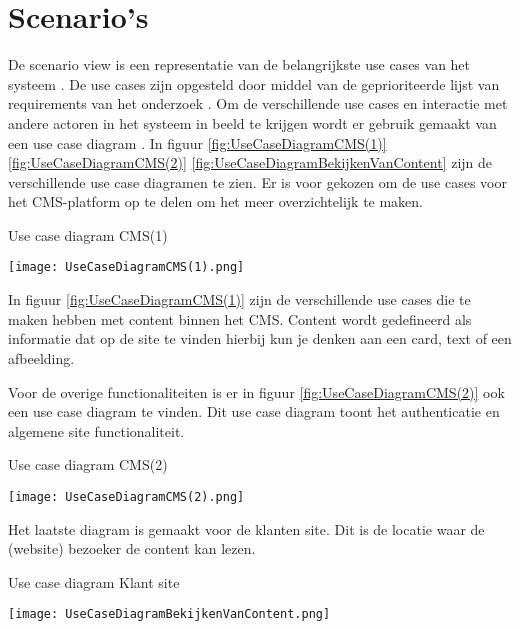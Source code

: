 \section{Scenario's}
De scenario view is een representatie van de belangrijkste use cases van het systeem \parencite{4+1ViewModelPaper}.
De use cases zijn opgesteld door middel van de geprioriteerde lijst van requirements van het onderzoek \parencite{DanteOnderzoek}.
Om de verschillende use cases en interactie met andere actoren in het systeem in beeld te krijgen wordt er gebruik gemaakt van een use case diagram \parencite{UseCaseDiagram}.
In figuur \ref{fig:UseCaseDiagramCMS(1)} \ref{fig:UseCaseDiagramCMS(2)} \ref{fig:UseCaseDiagramBekijkenVanContent} zijn de verschillende use case diagramen te zien.
Er is voor gekozen om de use cases voor het CMS-platform op te delen om het meer overzichtelijk te maken.

\whitespace[2]
\begin{graphic}
	\captionsetup{type=figure}
	\caption{Use case diagram CMS(1)}
	\texttt{[image: UseCaseDiagramCMS(1).png]}
	\label{fig:UseCaseDiagramCMS(1)}
\end{graphic}

\whitespace[2]
In figuur \ref{fig:UseCaseDiagramCMS(1)} zijn de verschillende use cases die te maken hebben met content binnen het CMS.
Content wordt gedefineerd als informatie dat op de site te vinden hierbij kun je denken aan een card, text of een afbeelding.
 
\newpage

\whitespace
Voor de overige functionaliteiten is er in figuur \ref{fig:UseCaseDiagramCMS(2)} ook een use case diagram te vinden.
Dit use case diagram toont het authenticatie en algemene site functionaliteit.

\whitespace
\begin{graphic}
	\captionsetup{type=figure}
	\caption{Use case diagram CMS(2)}
	\texttt{[image: UseCaseDiagramCMS(2).png]}
	\label{fig:UseCaseDiagramCMS(2)}
\end{graphic}

\whitespace
Het laatste diagram is gemaakt voor de klanten site.
Dit is de locatie waar de (website) bezoeker de content kan lezen.

\whitespace
\begin{graphic}
	\captionsetup{type=figure}
	\caption{Use case diagram Klant site}
	\texttt{[image: UseCaseDiagramBekijkenVanContent.png]}
	\label{fig:UseCaseDiagramBekijkenVanContent}
\end{graphic}
